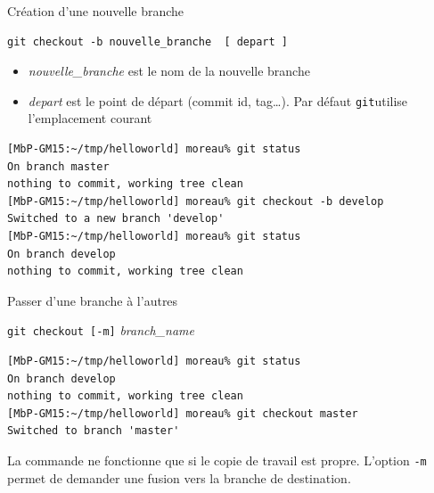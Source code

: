 \begin{frame}[fragile]{%
\protect\hypertarget{cruxe9ation-dune-nouvelle-branche}{%
Création d’une nouvelle branche}}

\begin{verbatim}
git checkout -b nouvelle_branche  [ depart ]
\end{verbatim}

\begin{itemize}
\tightlist
\item
  \emph{nouvelle\_branche} est le nom de la nouvelle branche
\item
  \emph{depart} est le point de départ (commit id, tag\ldots{}). Par
  défaut \texttt{git}utilise l’emplacement courant
\end{itemize}

\begin{verbatim}
[MbP-GM15:~/tmp/helloworld] moreau% git status
On branch master
nothing to commit, working tree clean
[MbP-GM15:~/tmp/helloworld] moreau% git checkout -b develop
Switched to a new branch 'develop'
[MbP-GM15:~/tmp/helloworld] moreau% git status
On branch develop
nothing to commit, working tree clean
\end{verbatim}

\end{frame}

\begin{frame}[fragile]{%
\protect\hypertarget{passer-dune-branche-uxe0-lautres}{%
Passer d’une branche à l’autres}}

\texttt{git\ checkout\ {[}-m{]}} \emph{branch\_name}

\begin{verbatim}
[MbP-GM15:~/tmp/helloworld] moreau% git status
On branch develop
nothing to commit, working tree clean
[MbP-GM15:~/tmp/helloworld] moreau% git checkout master
Switched to branch 'master'
\end{verbatim}

La commande ne fonctionne que si le copie de travail est propre.
L’option \texttt{-m} permet de demander une fusion vers la branche de
destination.

\end{frame}

